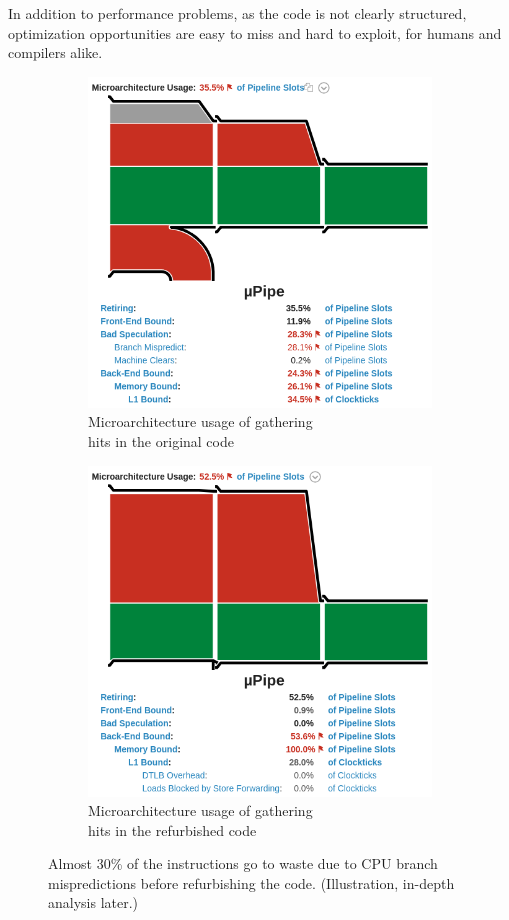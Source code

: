 \documentclass[12pt]{article}
\begin{document}
In addition to performance problems, as the code is not clearly structured, optimization opportunities are easy to miss and hard to exploit, for humans and compilers alike.

\begin{figure}[H]
	\centering
	\begin{subfigure}{.5\textwidth}
		\centering
		\includegraphics[width=.7\linewidth]{velout_gatherhits_orig_uarch}
		\caption{Microarchitecture usage of gathering\\ hits in the original code}
		\label{fig_velout_branch_example_sub1}
	\end{subfigure}%
	\begin{subfigure}{.5\textwidth}
		\centering
		\includegraphics[width=.7\linewidth]{velout_gatherhits_new_uarch}
		\caption{Microarchitecture usage of gathering\\ hits in the refurbished code}
		\label{fig_velout_branch_example_sub2}
	\end{subfigure}
	\caption{Almost 30\% of the instructions go to waste due to CPU branch mispredictions before refurbishing the code. (Illustration, in-depth analysis later.)}
	\label{fig_velout_branch_example}
\end{figure}
\end{document}
